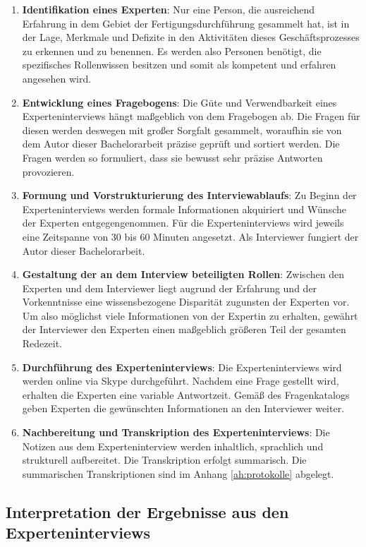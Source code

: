 \begin{enumerate}
    \item 
    \textbf{Identifikation eines Experten}: Nur eine Person, die ausreichend Erfahrung in dem Gebiet der Fertigungsdurchführung gesammelt hat, ist in der Lage, Merkmale und Defizite in den Aktivitäten dieses Geschäftsprozesses zu erkennen und zu benennen. Es werden also Personen benötigt, die spezifisches Rollenwissen besitzen und somit als kompetent und erfahren angesehen wird.
    \item
    \textbf{Entwicklung eines Fragebogens}: Die Güte und Verwendbarkeit eines Experteninterviews hängt maßgeblich von dem Fragebogen ab. Die Fragen für diesen werden deswegen mit großer Sorgfalt gesammelt, woraufhin sie von dem Autor dieser Bachelorarbeit präzise geprüft und sortiert werden. Die Fragen werden so formuliert, dass sie bewusst sehr präzise Antworten provozieren.
    \item
    \textbf{Formung und Vorstrukturierung des Interviewablaufs}: Zu Beginn der Experteninterviews werden formale Informationen akquiriert und Wünsche der Experten entgegengenommen. 
    Für die Experteninterviews wird jeweils eine Zeitspanne von 30 bis 60 Minuten angesetzt. Als Interviewer fungiert der Autor dieser Bachelorarbeit.
    \item
    \textbf{Gestaltung der an dem Interview beteiligten Rollen}: Zwischen den Experten und dem Interviewer liegt augrund der Erfahrung und der Vorkenntnisse eine wissensbezogene Disparität zugunsten der Experten vor. Um also möglichst viele Informationen von der Expertin zu erhalten, gewährt der Interviewer den Experten einen maßgeblich größeren Teil der gesamten Redezeit.
    \item
   \textbf{ Durchführung des Experteninterviews}: Die Experteninterviews wird werden online via Skype durchgeführt. Nachdem eine Frage gestellt wird, erhalten die Experten eine variable Antwortzeit. Gemäß des Fragenkatalogs geben Experten die gewünschten Informationen an den Interviewer weiter.
    \item
    \textbf{Nachbereitung und Transkription des Experteninterviews}: Die Notizen aus dem Experteninterview werden inhaltlich, sprachlich und strukturell aufbereitet. Die Transkription erfolgt summarisch. Die summarischen Transkriptionen sind im Anhang \ref{ah:protokolle} abgelegt.
    
\end{enumerate}

\subsection{Interpretation der Ergebnisse aus den Experteninterviews}

